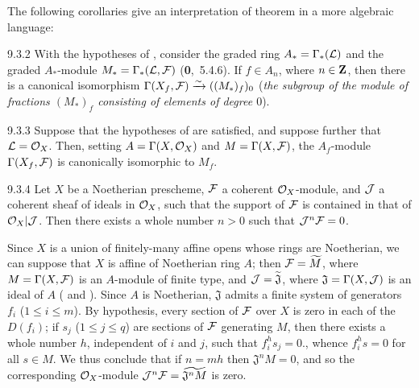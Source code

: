 The following corollaries give an interpretation of theorem  in a more algebraic
language:

\begin{env}[Corollary]{9.3.2}
\label{cor-1.9.3.2}
With the hypotheses of , consider the graded ring $A_\ast=\Gamma_\ast(\mathcal{L})$
and the graded $A_\ast$-module $M_\ast=\Gamma_\ast(\mathcal{L},\mathcal{F})$
{\normalfont(\textbf{0},~5.4.6)}. If $f\in A_n$, where $n\in\mathbf{Z}$, then there is
a canonical isomorphism $\Gamma(X_f,\mathcal{F})\xrightarrow{\sim}((M_\ast)_f)_0$
(\emph{the subgroup of the module of fractions $(M_\ast)_f$ consisting of elements of degree
$0$}).
\end{env}

\begin{env}[Corollary]{9.3.3}
\label{cor-1.9.3.3}
Suppose that the hypotheses of  are satisfied, and suppose further that
$\mathcal{L}=\mathcal{O}_X$. Then, setting $A=\Gamma(X,\mathcal{O}_X)$ and $M=\Gamma(X,\mathcal{F})$,
the $A_f$-module $\Gamma(X_f,\mathcal{F})$ is canonically isomorphic to $M_f$.
\end{env}

\begin{env}[Proposition]{9.3.4}
\label{prop-1.9.3.4}
Let $X$ be a Noetherian prescheme, $\mathcal{F}$ a coherent $\mathcal{O}_X$-module, and $\mathcal{J}$ a
coherent sheaf of ideals in $\mathcal{O}_X$, such that the support of $\mathcal{F}$ is contained in that
of $\mathcal{O}_X|\mathcal{J}$. Then there exists a whole number $n>0$ such that $\mathcal{J}^n\mathcal{F}=0$.
\end{env}

Since $X$ is a union of finitely-many affine opens whose rings are Noetherian, we can suppose
that $X$ is affine of Noetherian ring $A$; then $\mathcal{F}=\widetilde{M}$, where
$M=\Gamma(X,\mathcal{F})$ is an $A$-module of finite type, and $\mathcal{J}=\widetilde{\mathfrak{J}}$,
where $\mathfrak{J}=\Gamma(X,\mathcal{J})$ is an ideal of $A$ ( and ).
Since $A$ is Noetherian, $\mathfrak{J}$ admits a finite system of generators $f_i$ ($1\leq i\leq m$).
By hypothesis, every section of $\mathcal{F}$ over $X$ is zero in each of the $D(f_i)$; if $s_j$
($1\leq j\leq q$) are sections of $\mathcal{F}$ generating $M$, then there exists a whole number
$h$, independent of $i$ and $j$, such that $f_i^h s_j=0$., whence $f_i^h s=0$ for all
$s\in M$. We thus conclude that if $n=mh$ then $\mathfrak{J}^n M=0$, and so the corresponding
$\mathcal{O}_X$-module $\mathcal{J}^n\mathcal{F}=\widetilde{\mathfrak{J}^n M}$  is zero.


